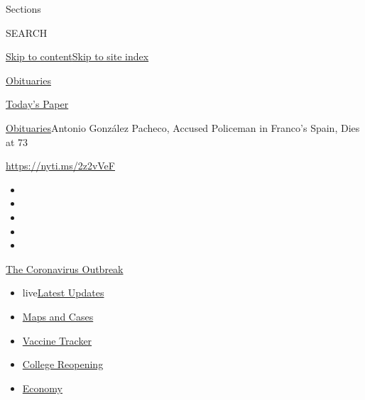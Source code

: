 Sections

SEARCH

\protect\hyperlink{site-content}{Skip to
content}\protect\hyperlink{site-index}{Skip to site index}

\href{https://www.nytimes.com/section/obituaries}{Obituaries}

\href{https://myaccount.nytimes.com/auth/login?response_type=cookie\&client_id=vi}{}

\href{https://www.nytimes.com/section/todayspaper}{Today's Paper}

\href{/section/obituaries}{Obituaries}\textbar{}Antonio González
Pacheco, Accused Policeman in Franco's Spain, Dies at 73

\url{https://nyti.ms/2z2vVeF}

\begin{itemize}
\item
\item
\item
\item
\item
\end{itemize}

\href{https://www.nytimes.com/news-event/coronavirus?action=click\&pgtype=Article\&state=default\&region=TOP_BANNER\&context=storylines_menu}{The
Coronavirus Outbreak}

\begin{itemize}
\tightlist
\item
  live\href{https://www.nytimes.com/2020/08/03/world/coronavirus-covid-19.html?action=click\&pgtype=Article\&state=default\&region=TOP_BANNER\&context=storylines_menu}{Latest
  Updates}
\item
  \href{https://www.nytimes.com/interactive/2020/us/coronavirus-us-cases.html?action=click\&pgtype=Article\&state=default\&region=TOP_BANNER\&context=storylines_menu}{Maps
  and Cases}
\item
  \href{https://www.nytimes.com/interactive/2020/science/coronavirus-vaccine-tracker.html?action=click\&pgtype=Article\&state=default\&region=TOP_BANNER\&context=storylines_menu}{Vaccine
  Tracker}
\item
  \href{https://www.nytimes.com/2020/08/02/us/covid-college-reopening.html?action=click\&pgtype=Article\&state=default\&region=TOP_BANNER\&context=storylines_menu}{College
  Reopening}
\item
  \href{https://www.nytimes.com/live/2020/08/03/business/stock-market-today-coronavirus?action=click\&pgtype=Article\&state=default\&region=TOP_BANNER\&context=storylines_menu}{Economy}
\end{itemize}

